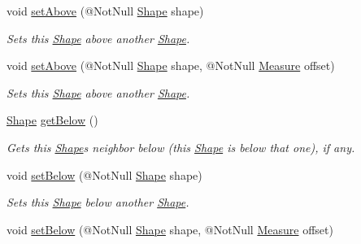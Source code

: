 \begin{DoxyCompactItemize}
void \hyperlink{classcom_1_1aarrelaakso_1_1drawl_1_1_shape_a47d2d3ec9719ad5ccc1d1dfb791358d4}{set\+Above} (@Not\+Null \hyperlink{classcom_1_1aarrelaakso_1_1drawl_1_1_shape}{Shape} shape)
\begin{DoxyCompactList}\small\item\em Sets this \hyperlink{classcom_1_1aarrelaakso_1_1drawl_1_1_shape}{Shape} above another \hyperlink{classcom_1_1aarrelaakso_1_1drawl_1_1_shape}{Shape}. \end{DoxyCompactList}\item 
void \hyperlink{classcom_1_1aarrelaakso_1_1drawl_1_1_shape_a3d3e7adc0ba7f4634c913773d326f4e6}{set\+Above} (@Not\+Null \hyperlink{classcom_1_1aarrelaakso_1_1drawl_1_1_shape}{Shape} shape, @Not\+Null \hyperlink{classcom_1_1aarrelaakso_1_1drawl_1_1_measure}{Measure} offset)
\begin{DoxyCompactList}\small\item\em Sets this \hyperlink{classcom_1_1aarrelaakso_1_1drawl_1_1_shape}{Shape} above another \hyperlink{classcom_1_1aarrelaakso_1_1drawl_1_1_shape}{Shape}. \end{DoxyCompactList}\item 
\hyperlink{classcom_1_1aarrelaakso_1_1drawl_1_1_shape}{Shape} \hyperlink{classcom_1_1aarrelaakso_1_1drawl_1_1_shape_a53de5ab609d879719cd3b372dfe8df58}{get\+Below} ()
\begin{DoxyCompactList}\small\item\em Gets this \hyperlink{classcom_1_1aarrelaakso_1_1drawl_1_1_shape}{Shape}\textquotesingle{}s neighbor below (this \hyperlink{classcom_1_1aarrelaakso_1_1drawl_1_1_shape}{Shape} is below that one), if any. \end{DoxyCompactList}\item 
void \hyperlink{classcom_1_1aarrelaakso_1_1drawl_1_1_shape_aabbe6165d905a690a38917443bf6e5b5}{set\+Below} (@Not\+Null \hyperlink{classcom_1_1aarrelaakso_1_1drawl_1_1_shape}{Shape} shape)
\begin{DoxyCompactList}\small\item\em Sets this \hyperlink{classcom_1_1aarrelaakso_1_1drawl_1_1_shape}{Shape} below another \hyperlink{classcom_1_1aarrelaakso_1_1drawl_1_1_shape}{Shape}. \end{DoxyCompactList}\item 
void \hyperlink{classcom_1_1aarrelaakso_1_1drawl_1_1_shape_a9e6a74a094d67337b42a626d8aa167a8}{set\+Below} (@Not\+Null \hyperlink{classcom_1_1aarrelaakso_1_1drawl_1_1_shape}{Shape} shape, @Not\+Null \hyperlink{classcom_1_1aarrelaakso_1_1drawl_1_1_measure}{Measure} offset)

\end{DoxyCompactItemize}
